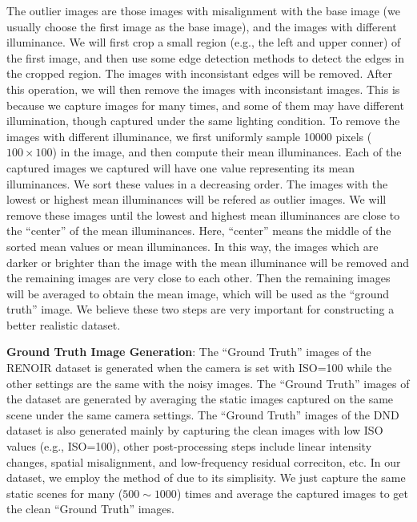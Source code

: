 The outlier images are those images with misalignment with the base image (we usually choose the first image as the base image), and the images with different illuminance. We will first crop a small region (e.g., the left and upper conner) of the first image, and then use some edge detection methods \cite{} to detect the edges in the cropped region. The images with inconsistant edges will be removed. After this operation, we will then remove the images with inconsistant images. This is because we capture images for many times, and some of them may have different illumination, though captured under the same lighting condition. To remove the images with different illuminance, we first uniformly sample 10000 pixels ($100\times100$) in the image, and then compute their mean illuminances. Each of the captured images we captured will have one value representing its mean illuminances. We sort these values in a decreasing order. The images with the lowest or highest mean illuminances will be refered as outlier images. We will remove these images until the lowest and highest mean illuminances are close to the ``center'' of the mean illuminances. Here, ``center'' means the middle of the sorted mean values or mean illuminances. In this way, the images which are darker or brighter than the image with the mean illuminance will be removed and the remaining images are very close to each other. Then the remaining images will be averaged to obtain the mean image, which will be used as the ``ground truth'' image. We believe these two steps are very important for constructing a better realistic dataset.



\textbf{Ground Truth Image Generation}: The ``Ground Truth'' images of the RENOIR dataset \cite{RENOIR2014} is generated when the camera is set with ISO=100 while the other settings are the same with the noisy images. The ``Ground Truth'' images of the dataset \cite{crosschannel2016} are generated by averaging the static images captured on the same scene under the same camera settings. The ``Ground Truth'' images of the DND dataset \cite{dnd2017} is also generated mainly by capturing the clean images with low ISO values (e.g., ISO=100), other post-processing steps include   linear intensity changes, spatial misalignment, and low-frequency residual correciton, etc. In our dataset, we employ the method of \cite{crosschannel2016} due to its simplisity. We just capture the same static scenes for many ($500\sim1000$) times and average the captured images to get the clean ``Ground Truth'' images.




